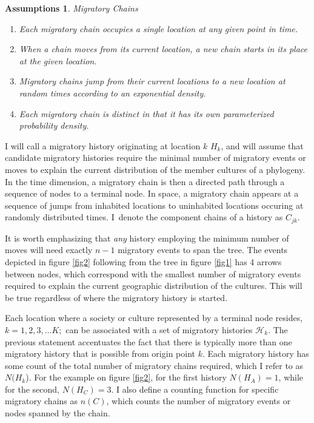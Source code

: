 \documentclass[11pt]{article}
\newtheorem{assumptions}{Assumptions}
\begin{document}
\begin{assumptions}{Migratory Chains}    
\begin{enumerate}
\item Each migratory chain occupies a single location at any given point in time.
\item When a chain moves from its current location, a new chain starts in its place at the given location.
\item Migratory chains jump from their current locations to a new location at random times according to an exponential density.
\item Each migratory chain is distinct in that it has its own parameterized probability density.
\end{enumerate}
\end{assumptions}
I will call a migratory history originating at location $k$ $H_k$, and will assume that candidate migratory histories require the minimal number of migratory events or moves to explain the current distribution of the member cultures of a phylogeny. In the time dimension, a migratory chain is then a directed path through a sequence of nodes to a terminal node. In space, a migratory chain appears at a sequence of jumps from inhabited locations to uninhabited locations occuring at randomly distributed times. I\ denote the component chains of a history as $C_{jk}$.

It is worth emphasizing that \textit{any} history employing the minimum number of moves will need exactly $n-1$ migratory events to span the tree. The events depicted in figure \ref{fig2} following from the tree in figure \ref{fig1} has 4 arrows between nodes, which correspond with the smallest number of migratory events required to explain the current geographic distribution of the cultures. This will be true regardless of where the migratory history is started. 

Each location where a society or culture represented by a terminal node resides,  $k=1,2,3,\hdots K;$ can be associated with a set of migratory histories $\mathcal{H}_k$. The previous statement accentuates the fact that there is typically more than one migratory history that is possible from origin point $k$. Each migratory history has some count of the total number of migratory chains required, which I refer to as  $N(H_k$). For the example on figure \ref{fig2}, for the first history $N(H_A)=1$, while for the second, $N(H_C)=3$.    I also define a counting function for specific migratory chains as $n(C)$, which counts the number of migratory events or nodes spanned by the chain. 
\end{document}
